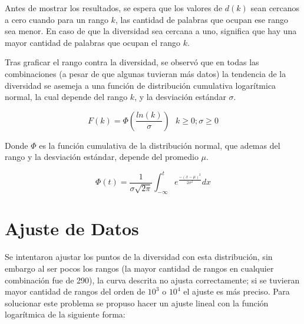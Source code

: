 Antes de mostrar los resultados, se espera  que los valores de $d(k)$ sean cercanos a cero cuando  para un rango $k$, las cantidad de palabras que ocupan ese rango sea menor. En caso de que la diversidad sea cercana a uno,  significa que hay una mayor cantidad de palabras que ocupan el rango $k$. 


Tras graficar el rango contra la diversidad, se observó que en todas las combinaciones (a pesar de que algunas tuvieran más datos)  la tendencia de la diversidad  se asemeja a una función de distribución cumulativa logarítmica  normal, la cual depende del rango $k$, y la desviación estándar $\sigma$.

\begin{equation}
	\label{ec.cumulativa}
	F(k) = \Phi \left ( \frac{ln(k)}{\sigma} \right )\,\,\,\,k\geq 0; \sigma \geq 0
\end{equation}

Donde $\Phi$ es la función cumulativa de la distribución normal, que ademas del rango y la desviación estándar, depende del promedio $\mu$.

\begin{equation}
	\label{ec.distribucionnormal}
	\Phi(t) = \frac{1}{\sigma\sqrt{2\pi}} \int_{-\infty}^{t}  e^{ \frac{ - \left ( x-\mu \right )^{2}}{2\sigma^2}  } dx	
\end{equation}



\section{Ajuste de Datos}


Se intentaron ajustar los puntos de la diversidad con esta distribución, sin embargo al ser pocos los rangos (la mayor cantidad de rangos en cualquier combinación fue de 290),  la curva descrita  no ajusta correctamente;  si se tuvieran mayor cantidad de rangos del orden de $10^{3}$ o $10^{4}$ el ajuste es más preciso.  Para solucionar este problema se propuso hacer un ajuste lineal con la función logarítmica  de la siguiente forma:



